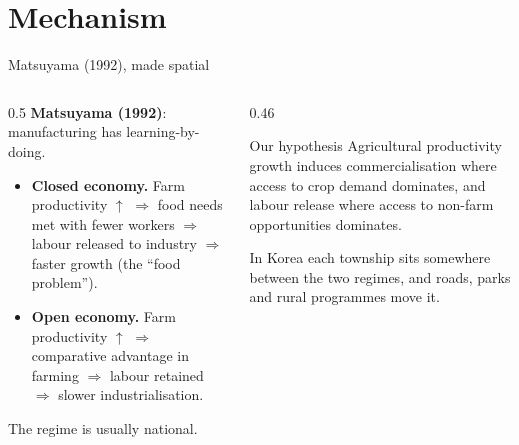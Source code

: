 \documentclass[10pt,aspectratio=169]{beamer}
\newcommand{\hl}[1]{\textcolor{mOrange}{#1}}
\begin{document}
\section{Mechanism}

\begin{frame}{Matsuyama (1992), made spatial}
  \begin{columns}[T]
    \begin{column}{0.5\textwidth}
      \textbf{Matsuyama (1992)}: manufacturing has learning-by-doing.
      \begin{itemize}\small
        \item \textbf{Closed economy.} Farm productivity $\uparrow$ $\Rightarrow$ food
              needs met with fewer workers $\Rightarrow$ labour \hl{released} to
              industry $\Rightarrow$ faster growth (the ``food problem'').
        \item \textbf{Open economy.} Farm productivity $\uparrow$ $\Rightarrow$
              comparative advantage in farming $\Rightarrow$ labour \hl{retained}
              $\Rightarrow$ slower industrialisation.
      \end{itemize}
      The regime is usually national.
    \end{column}
    \begin{column}{0.46\textwidth}
      \begin{block}{Our hypothesis}
        Agricultural productivity growth induces \hl{commercialisation} where access to
        crop demand dominates, and \hl{labour release} where access to non-farm
        opportunities dominates.
      \end{block}
      \small
      In Korea each township sits somewhere between the two regimes, and roads, parks and
      rural programmes move it.
    \end{column}
  \end{columns}
\end{frame}
\end{document}
